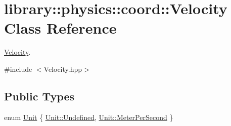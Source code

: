 \hypertarget{classlibrary_1_1physics_1_1coord_1_1_velocity}{}\section{library\+:\+:physics\+:\+:coord\+:\+:Velocity Class Reference}
\label{classlibrary_1_1physics_1_1coord_1_1_velocity}


\hyperlink{classlibrary_1_1physics_1_1coord_1_1_velocity}{Velocity}.  




{\ttfamily \#include $<$Velocity.\+hpp$>$}

\subsection*{Public Types}
\begin{DoxyCompactItemize}
\item 
enum \hyperlink{classlibrary_1_1physics_1_1coord_1_1_velocity_a8bbc811932c454dbe0ab8b56f1b2c0b3}{Unit} \{ \hyperlink{classlibrary_1_1physics_1_1coord_1_1_velocity_a8bbc811932c454dbe0ab8b56f1b2c0b3aec0fc0100c4fc1ce4eea230c3dc10360}{Unit\+::\+Undefined}, 
\hyperlink{classlibrary_1_1physics_1_1coord_1_1_velocity_a8bbc811932c454dbe0ab8b56f1b2c0b3a0af408165b5f88fcd7b687312b754ade}{Unit\+::\+Meter\+Per\+Second}
 \}
\end{DoxyCompactItemize}
